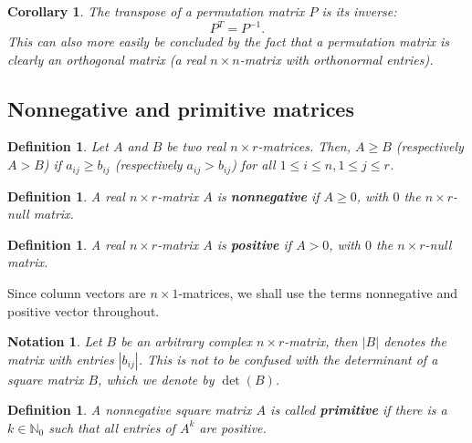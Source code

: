 \documentclass[a4paper,11pt]{report}
\newtheorem{definition}[theorem]{Definition}
\newtheorem{corollary}[theorem]{Corollary}
\newtheorem{notation}[theorem]{Notation}
\newcommand{\N}{{\mathbb N}}
\begin{document}
\begin{corollary}
  The transpose of a permutation matrix $P$ is its inverse:
  $$P^T = P^{-1}.$$
  This can also more easily be concluded by the fact that a permutation matrix 
  is clearly an orthogonal matrix (a real $n \times n$-matrix with orthonormal 
  entries).
\end{corollary}
\subsection{Nonnegative and primitive matrices}
\begin{definition}\label{groterkleiner}
  Let $A$ and $B$ be two real $n\times r$-matrices. Then, $A \geq B$ (respectively $A > B$) if $a_{ij} \geq b_{ij}$ 
  (respectively $a_{ij}>b_{ij}$) for all $1 \leq i \leq n, 1 \leq j\leq r$. 
\end{definition}
\begin{definition}  A real $n\times r$-matrix $A$ is \textbf{nonnegative} if $A \geq 0$, with $0$ the $n\times r$-null matrix.
\end{definition}
\begin{definition}  A real $n\times r$-matrix $A$ is \textbf{positive} if $A > 0$, with $0$ the $n\times r$-null matrix.
\end{definition}

Since column vectors are $n \times 1$-matrices, we shall use the terms 
nonnegative and positive vector throughout. 

\begin{notation}\label{modulusmatrix}
  Let $B$ be an arbitrary complex $n\times r$-matrix, then $|B|$ denotes the 
  matrix with entries $|b_{ij}|$. This is not to be confused with the 
  determinant of a square matrix $B$, which we denote by $\det(B)$.
\end{notation}

\begin{definition}  A nonnegative square matrix $A$ is called \textbf{primitive} if there is a $k \in \N_0$ such that all entries of $A^k$ are positive.
 \end{definition}
\end{document}
